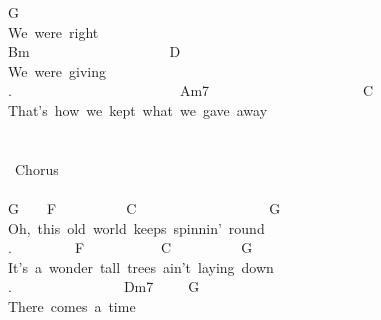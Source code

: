 {G\\
We\ were\ right\\
Bm\ \ \ \ \ \ \ \ \ \ \ \ \ \ \ \ \ \ \ \ D\\
We\ were\ giving\\
.\ \ \ \ \ \ \ \ \ \ \ \ \ \ \ \ \ \ \ \ \ \ \ \ Am7\ \ \ \ \ \ \ \ \ \ \ \ \ \ \ \ \ \ \ \ \ \ C\\
That's\ how\ we\ kept\ what\ we\ gave\ away\\
\\
\\
\lbrack\ Chorus\rbrack\\
\\
G\ \ \ \ F\ \ \ \ \ \ \ \ \ \ C\ \ \ \ \ \ \ \ \ \ \ \ \ \ \ \ \ \ \ G\\
Oh,\ this\ old\ world\ keeps\ spinnin'\ round\ \\
.\ \ \ \ \ \ \ \ \ F\ \ \ \ \ \ \ \ \ \ \ C\ \ \ \ \ \ \ \ \ \ G\\
It's\ a\ wonder\ tall\ trees\ ain't\ laying\ down\\
.\ \ \ \ \ \ \ \ \ \ \ \ \ \ \ \ Dm7\ \ \ \ \ G\\
There\ comes\ a\ time}
